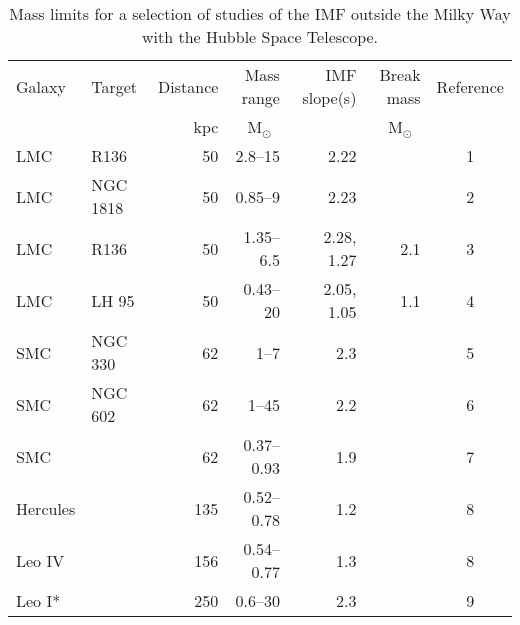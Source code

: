 \documentclass{aa}
\newcommand{\msun}{M$_\odot$~}
\begin{document}
\begin{table*}

    \centering
    \caption{Mass limits for a selection of studies of the IMF outside the Milky Way with the Hubble Space Telescope. }
    \label{tbl:imf_lit_review}

    \begin{tabular}{ l l r r r r c }
        \hline
        \hline
        Galaxy   &  Target      &  Distance &  Mass range       & IMF slope(s) & Break mass          & Reference         \\
                &               & kpc       & \msun             &              & \msun               &                   \\
        \hline
        LMC      &  R136        & 50        & 2.8--15            & 2.22         &                     & 1 \\
        LMC      &  NGC 1818    & 50        & 0.85--9            & 2.23         &                     & 2  \\
        LMC      &  R136        & 50        & 1.35--6.5          & 2.28, 1.27   & 2.1                 & 3     \\
        LMC      &  LH 95       & 50        & 0.43--20           & 2.05, 1.05   & 1.1                 & 4      \\
        \hline
        SMC      &  NGC 330     & 62        & 1--7               & 2.3          &                     & 5    \\
        SMC      &  NGC 602     & 62        & 1--45              & 2.2          &                     & 6     \\
        SMC      &              & 62        & 0.37--0.93         & 1.9          &                     & 7     \\
        \hline
        Hercules &              & 135       & 0.52--0.78         & 1.2          &                     & 8         \\
        Leo IV   &              & 156       & 0.54--0.77         & 1.3          &                     & 8         \\
        Leo I*   &              & 250       & 0.6--30            & 2.3          &                     & 9     \\
        \hline
        \end{tabular}


\end{table*}
\end{document}
